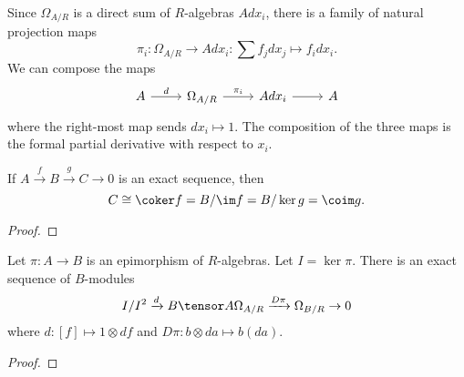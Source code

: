 Since $\Omega_{A/R}$ is a direct sum of $R$-algebras $Adx_i$,
there is a family of natural projection maps 
  \[ \pi_i : \Omega_{A/R} \to Adx_i : \sum f_jdx_j \mapsto f_idx_i. \]
We can compose the maps
  \[ \begin{tikzcd}
    A \arrow{r}{d} & \Omega_{A/R} \arrow{r}{\pi_i} & Adx_i \arrow{r}{} & A
  \end{tikzcd} \]
where the right-most map sends $dx_i \mapsto 1$.
The composition of the three maps is the formal partial derivative with respect to $x_i$.

\begin{proposition}
  \label{prop_exact_sequence_cokernel}
  If $A \xrightarrow f B \xrightarrow g C \to 0$ is an exact sequence, then
    \[ C \cong \coker f = B / \im f = B / \ker g = \coim g. \]
\end{proposition}
\begin{proof}
\end{proof}

\begin{proposition}
  \label{prop_conormal_sequence}
  Let $\pi : A \to B$ is an epimorphism of $R$-algebras.
  Let $I = \ker \pi$.
  There is an exact sequence of $B$-modules
    \[ I/I^2 \xrightarrow{d} B \tensor A \Omega_{A/R} \xrightarrow{D\pi} \Omega_{B/R} \to 0 \]
  where $d : [f] \mapsto 1 \otimes df$ and $D\pi : b \otimes da \mapsto b(da)$.
\end{proposition}
\begin{proof}
\end{proof}

